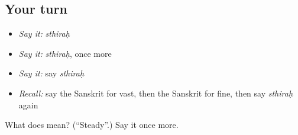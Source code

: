 \subsection*{Your turn}
\begin{itemize}
\raggedright
  \item \emph{Say it:} \emph{sthiraḥ}
  \item \emph{Say it:} \emph{sthiraḥ}, once more
  \item \emph{Say it:} say \emph{sthiraḥ}
  \item \emph{Recall:} say the Sanskrit for vast, then the Sanskrit for fine, then say \emph{sthiraḥ} again
\end{itemize}

\begin{tcolorbox}[breakable,colback=teal!4,colframe=teal!35!black,title={Before you move on}]
What does  mean? (\textquotedblleft{}Steady\textquotedblright{}.) Say it once more.
\end{tcolorbox}
